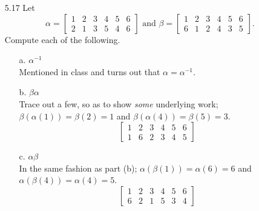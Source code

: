 \documentclass[12pt]{article}
\begin{document}
\begin{enumerate}
\item[5.17] Let 
\[
\alpha = 
\left[
\begin{array}{cccccc} 
1 & 2 & 3 & 4 & 5 & 6 \\
2 & 1 & 3 & 5 & 4 & 6
\end{array}
\right]
\mbox{ and } 
\beta = 
\left[
\begin{array}{cccccc} 
1 & 2 & 3 & 4 & 5 & 6 \\
6 & 1 & 2 & 4 & 3 & 5
\end{array}
\right].
\]
Compute each of the following.
\begin{enumerate}
\item[a.] $\alpha^{-1}$ \\
Mentioned in class and turns out that $\alpha = \alpha^{-1}$.
\item[b.] $\beta\alpha$ \\
Trace out a few, so as to show \emph{some} underlying work; 
$\beta(\alpha(1)) = \beta(2) = 1$ and $\beta(\alpha(4)) = \beta(5) = 3$. 
\[ 
\left[ 
\begin{array}{cccccc} 
1 & 2 & 3 & 4 & 5 & 6 \\
1 & 6 & 2 & 3 & 4 & 5 
\end{array} 
\right]
\]
\item[c.] $\alpha\beta$ \\
In the same fashion as part (b);
$\alpha(\beta(1)) = \alpha(6) = 6$ and $\alpha(\beta(4)) = \alpha(4) = 5$.
\[ 
\left[ 
\begin{array}{cccccc} 
1 & 2 & 3 & 4 & 5 & 6 \\
6 & 2 & 1 & 5 & 3 & 4 
\end{array} 
\right]
\]
\end{enumerate}


\end{enumerate}
\end{document}
